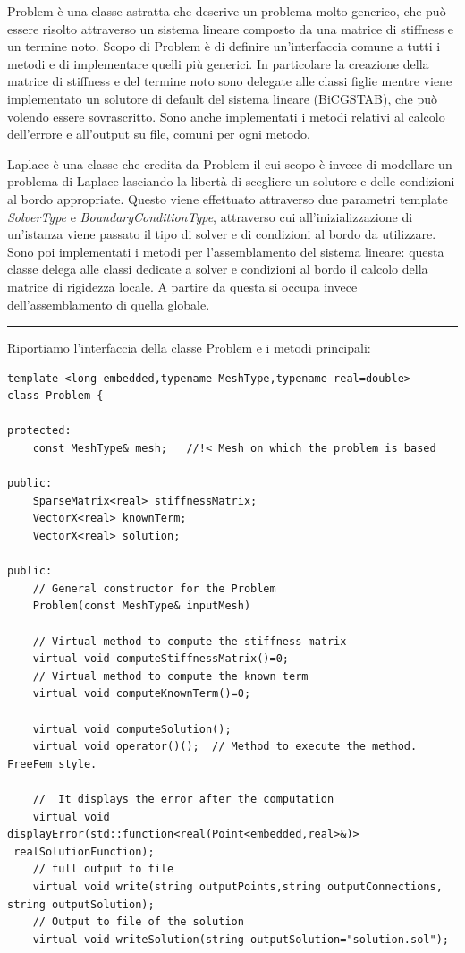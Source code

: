 \documentclass[oneside,12pt]{book}  %
\theoremstyle{plain}
\theoremstyle{definition}
\theoremstyle{remark}
\numberwithin{equation}{chapter} %
\begin{document}
Problem \`e una classe astratta che descrive un problema molto generico, che pu\`o
essere risolto attraverso un sistema lineare composto da una matrice
di stiffness e un termine noto. Scopo di Problem \`e di definire
un'interfaccia comune a tutti i metodi e di implementare quelli
pi\`u generici. In particolare la creazione della matrice di stiffness
e del termine noto sono delegate alle classi figlie mentre viene
implementato un solutore di default del sistema lineare (BiCGSTAB),
che pu\`o volendo essere sovrascritto. Sono anche implementati i
metodi relativi al calcolo dell'errore e all'output su file, comuni per ogni metodo.

Laplace \`e una classe che eredita da Problem il cui scopo \`e invece
di modellare un problema di Laplace lasciando la libert\`a di
scegliere un solutore e delle condizioni al bordo appropriate.  
Questo viene effettuato attraverso due parametri template
\textit{SolverType} e \textit{BoundaryConditionType}, attraverso cui
all'inizializzazione di un'istanza viene passato il tipo di solver e
di condizioni al bordo da utilizzare.
Sono poi implementati i metodi per l'assemblamento del sistema
lineare: questa classe delega alle classi
dedicate a solver e condizioni al bordo il calcolo della matrice di
rigidezza locale. A partire da questa si occupa invece dell'assemblamento di quella
globale.

\noindent\rule{14cm}{1pt}

Riportiamo l'interfaccia della classe Problem e i metodi principali:

\begin{verbatim}
template <long embedded,typename MeshType,typename real=double>
class Problem {
	
protected:
    const MeshType& mesh;	//!< Mesh on which the problem is based

public:
    SparseMatrix<real> stiffnessMatrix;
    VectorX<real> knownTerm;
    VectorX<real> solution;
	
public:
    // General constructor for the Problem
    Problem(const MeshType& inputMesh)

    // Virtual method to compute the stiffness matrix
    virtual void computeStiffnessMatrix()=0;
    // Virtual method to compute the known term
    virtual void computeKnownTerm()=0;	

    virtual void computeSolution();
    virtual void operator()();  // Method to execute the method. FreeFem style.

    //  It displays the error after the computation
    virtual void displayError(std::function<real(Point<embedded,real>&)>
 realSolutionFunction);
    // full output to file 
    virtual void write(string outputPoints,string outputConnections,
string outputSolution);	
    // Output to file of the solution
    virtual void writeSolution(string outputSolution="solution.sol");


\end{verbatim}
\end{document}

